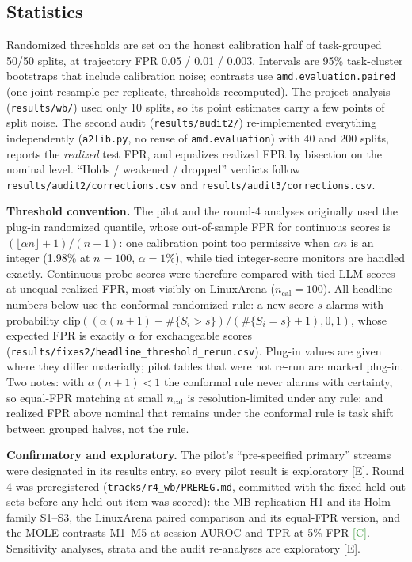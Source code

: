 \documentclass[11pt]{article}
\newcommand{\tC}{\textsf{\scriptsize\textcolor{ForestGreen}{[C]}}\xspace}
\newcommand{\tE}{\textsf{\scriptsize\textcolor{ink2}{[E]}}\xspace}
\begin{document}
\subsection{Statistics}\label{sec:stats}
Randomized thresholds are set on the honest calibration half of task-grouped 50/50 splits, at trajectory FPR 0.05 / 0.01 / 0.003. Intervals are 95\% task-cluster bootstraps that include calibration noise; contrasts use \texttt{amd.evaluation.paired} (one joint resample per replicate, thresholds recomputed). The project analysis (\nolinkurl{results/wb/}) used only 10 splits, so its point estimates carry a few points of split noise. The second audit (\nolinkurl{results/audit2/}) re-implemented everything independently (\texttt{a2lib.py}, no reuse of \texttt{amd.evaluation}) with 40 and 200 splits, reports the \emph{realized} test FPR, and equalizes realized FPR by bisection on the nominal level. ``Holds / weakened / dropped'' verdicts follow \nolinkurl{results/audit2/corrections.csv} and \nolinkurl{results/audit3/corrections.csv}.

\textbf{Threshold convention.} The pilot and the round-4 analyses originally used the plug-in randomized quantile, whose out-of-sample FPR for continuous scores is $(\lfloor\alpha n\rfloor+1)/(n+1)$: one calibration point too permissive when $\alpha n$ is an integer (1.98\% at $n=100$, $\alpha=1\%$), while tied integer-score monitors are handled exactly. Continuous probe scores were therefore compared with tied LLM scores at unequal realized FPR, most visibly on LinuxArena ($n_\text{cal}=100$). All headline numbers below use the conformal randomized rule: a new score $s$ alarms with probability $\mathrm{clip}((\alpha(n+1)-\#\{S_i>s\})/(\#\{S_i=s\}+1),0,1)$, whose expected FPR is exactly $\alpha$ for exchangeable scores (\nolinkurl{results/fixes2/headline_threshold_rerun.csv}). Plug-in values are given where they differ materially; pilot tables that were not re-run are marked plug-in. Two notes: with $\alpha(n+1)<1$ the conformal rule never alarms with certainty, so equal-FPR matching at small $n_\text{cal}$ is resolution-limited under any rule; and realized FPR above nominal that remains under the conformal rule is task shift between grouped halves, not the rule.

\textbf{Confirmatory and exploratory.} The pilot's ``pre-specified primary'' streams were designated in its results entry, so every pilot result is exploratory \tE. Round 4 was preregistered (\nolinkurl{tracks/r4_wb/PREREG.md}, committed with the fixed held-out sets before any held-out item was scored): the MB replication H1 and its Holm family S1--S3, the LinuxArena paired comparison and its equal-FPR version, and the MOLE contrasts M1--M5 at session AUROC and TPR at 5\% FPR \tC. Sensitivity analyses, strata and the audit re-analyses are exploratory \tE.
\end{document}
